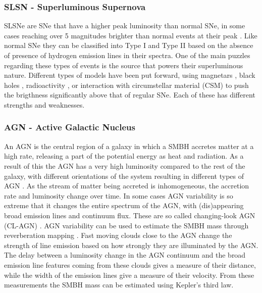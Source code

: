 \documentclass[a4paper,oneside,12pt, class=Latex/Classes/PhDthesisPSnPDF, crop=false]{standalone}
\begin{document}
\subsubsection{SLSN - Superluminous Supernova}
SLSNe are SNe that have a higher peak luminosity than normal SNe, in some cases reaching over 5 magnitudes brighter than normal events at their peak \citep{SLSN_Gal-Yam}. Like normal SNe they can be classified into Type I and Type II based on the absence of presence of hydrogen emission lines in their spectra. One of the main puzzles regarding these types of events is the source that powers their superluminous nature. Different types of models have been put forward, using magnetars \citep{Maeda_SLSN_magentar}, black holes \citep{SLSN_BH}, radioactivity \citep{Kasen_SLSN_pair_instab}, or interaction with circumstellar material (CSM) \citep{Late-time_CSM_SLSNE_I} to push the brigthness significantly above that of regular SNe. Each of these has different strengths and weaknesses.


\subsubsection{AGN - Active Galactic Nucleus}
An AGN is the central region of a galaxy in which a SMBH accretes matter at a high rate, releasing a part of the potential energy as heat and radiation. As a result of this the AGN has a very high luminosity compared to the rest of the galaxy, with different orientations of the system resulting in different types of AGN \citep{Antonucci_1993_AGN, Urry_1995_AGN}. As the stream of matter being accreted is inhomogeneous, the accretion rate and luminosity change over time. In some cases AGN variability is so extreme that it changes the entire spectrum of the AGN, with (dis)appearing broad emission lines and continuum flux. These are so called changing-look AGN (CL-AGN) \citep[see][for a review]{CLAGN}. AGN variability can be used to estimate the SMBH mass through reverberation mapping \citep{Reverberation_mapping, Reverberation_Peterson}. Fast moving clouds close to the AGN change the strength of line emission based on how strongly they are illuminated by the AGN. The delay between a luminosity change in the AGN continuum and the broad emission line features coming from these clouds gives a measure of their distance, while the width of the emission lines give a measure of their velocity. From these measurements the SMBH mass can be estimated using Kepler's third law.
\end{document}
